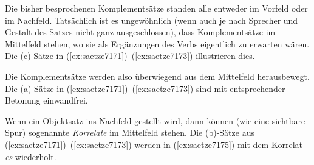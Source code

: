 Die bisher besprochenen Komplementsätze standen alle entweder im Vorfeld oder im Nachfeld.
Tatsächlich ist es ungewöhnlich (wenn auch je nach Sprecher und Gestalt des Satzes nicht ganz ausgeschlossen), dass Komplementsätze im Mittelfeld stehen, wo sie als Ergänzungen des Verbs eigentlich zu erwarten wären.
Die (c)-Sätze in (\ref{ex:saetze7171})--(\ref{ex:saetze7173}) illustrieren dies.

\begin{exe}
  \ex\label{ex:saetze7171}
  \begin{xlist}
  \end{xlist}
  \ex\label{ex:saetze7172}
  \begin{xlist}
  \end{xlist}
  \ex\label{ex:saetze7173}
  \begin{xlist}
  \end{xlist}
\end{exe}

Die Komplementsätze werden also überwiegend aus dem Mittelfeld herausbewegt.
Die (a)-Sätze in (\ref{ex:saetze7171})--(\ref{ex:saetze7173}) sind mit entsprechender Betonung einwandfrei.

Wenn ein Objektsatz ins Nachfeld gestellt wird, dann können (wie eine sichtbare Spur) sogenannte \textit{Korrelate} im Mittelfeld stehen.
Die (b)-Sätze aus (\ref{ex:saetze7171})--(\ref{ex:saetze7173}) werden in (\ref{ex:saetze7175}) mit dem Korrelat \textit{es} wiederholt.

\begin{exe}
  \ex\label{ex:saetze7175}
  \begin{xlist}
  \end{xlist}
\end{exe}

